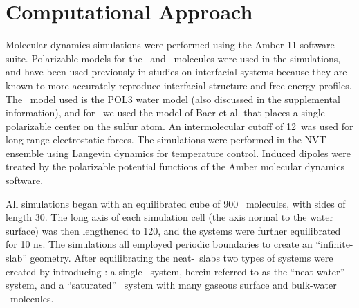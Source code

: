 \documentclass{article}
\begin{document}
\section{Computational Approach}

Molecular dynamics simulations were performed using the Amber 11 software suite.\cite{Case2010} Polarizable models for the \wat~and \suldiox~molecules were used in the simulations, and have been used previously in studies on interfacial systems because they are known to more accurately reproduce interfacial structure and free energy profiles.\cite{Wick2007,Rivera2006,Dang1998} The \wat~model used is the POL3 water model (also discussed in the supplemental information),\cite{Caldwell1995} and for \suldiox~we used the model of Baer et al. that places a single polarizable center on the sulfur atom.\cite{Baer2010} An intermolecular cutoff of 12\angs~was used for long-range electrostatic forces. The simulations were performed in the NVT ensemble using Langevin dynamics for temperature control. Induced dipoles were treated by the polarizable potential functions of the Amber molecular dynamics software.

All simulations began with an equilibrated cube of 900 \wat~molecules, with sides of length 30\angs. The long axis of each simulation cell (the axis normal to the water surface) was then lengthened to 120\angs, and the systems were further equilibrated for 10 ns. The simulations all employed periodic boundaries to create an ``infinite-slab'' geometry. After equilibrating the neat-\wat~slabs two types of systems were created by introducing \suldiox: a single-\suldiox~system, herein referred to as the ``neat-water'' system, and a ``saturated'' \suldiox~system with many gaseous surface and bulk-water \suldiox~molecules.
\end{document}
